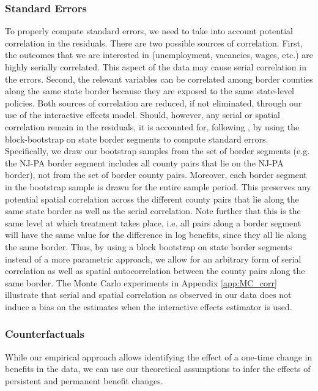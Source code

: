 \documentclass[12pt]{article}
\newcommand{\1}{\mathbf{1}}
\begin{document}
\subsubsection{Standard Errors}
To properly compute standard errors, we need to take into account potential correlation in the residuals. There are two possible sources of correlation. First, the outcomes that we are interested in (unemployment, vacancies, wages, etc.) are highly serially correlated. This aspect of the data may cause serial correlation in the errors. Second, the relevant variables can be correlated among border counties along the same state border because they are exposed to the same state-level policies. Both sources of correlation are reduced, if not eliminated, through our use of the interactive effects model. Should, however, any serial or spatial correlation remain in the residuals, it is accounted for, following \citet{bertrand+etal:04}, by using the block-bootstrap on state border segments to compute standard errors. Specifically, we draw our bootstrap samples from the set of border segments (e.g. the NJ-PA border segment includes all county pairs that lie on the NJ-PA border), not from the set of border county pairs. Moreover, each border segment in the bootstrap sample is drawn for the entire sample period. This preserves any potential spatial correlation across the different county pairs that lie along the same state border as well as the serial correlation. Note further that this is the same level at which treatment takes place, i.e. all pairs along a border segment will have the same value for the difference in log benefits, since they all lie along the same border. Thus, by using a block bootstrap on state border segments instead of a more parametric approach, we allow for an arbitrary form of serial correlation as well as spatial autocorrelation between the county pairs along the same border. The Monte Carlo experiments in Appendix \ref{app:MC_corr} illustrate that serial and spatial correlation as observed in our data does not induce a bias on the estimates when the interactive effects estimator is used.



\subsubsection{Counterfactuals}
While our empirical approach allows identifying the effect of a one-time change in benefits in the data, we can use our theoretical assumptions to infer the effects of persistent and permanent benefit changes. 
\end{document}
